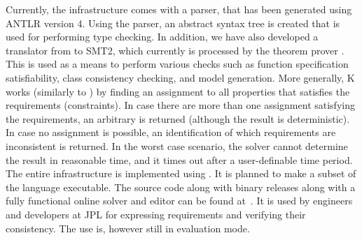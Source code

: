 Currently, the \Klang{} infrastructure comes with a parser, that has
been generated using ANTLR version 4. Using the parser, an abstract syntax
tree is
created that is used for performing type checking. In addition, 
we have also developed a translator from
\Klang{} to SMT2, which currently is processed by the \zthree{}
theorem prover \cite{de2008z3}.  This is used as a means to perform various checks
such as function specification satisfiability, class consistency
checking, and model generation. 
More generally, K works (similarly to \zthree{}) by finding an 
assignment to all properties that satisfies the requirements (constraints). 
In case there are more than one assignment satisfying the 
requirements, an arbitrary is returned (although the result is 
deterministic). In case no assignment is possible, an 
identification of which 
requirements are inconsistent is returned. In the worst
case scenario, the solver cannot determine the result 
in reasonable time, and it times out after a user-definable
time period.
The entire \Klang{} infrastructure is
implemented using \scala. It is planned to make a subset
of the language executable. The source code along with binary
releases along with a fully functional online solver and \Klang{}
editor can be found at~\cite{theklanguage}. It is used by engineers and
developers at JPL for expressing requirements and verifying their
consistency. The use is, however still in evaluation mode.

 
